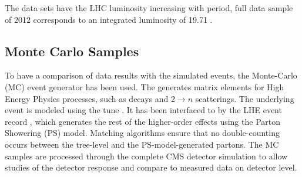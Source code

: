 The data sets have the LHC luminosity increasing with period, full data sample of 2012 corresponds to an integrated luminosity of 19.71 \fbinv. 

\subsection{Monte Carlo Samples}
To have a comparison of data results with the simulated events, the \MadGraphF \cite{Alwall:2011uj} Monte-Carlo (MC) event generator has been used. The \MadGraphF generates matrix elements for High Energy Physics processes, such as decays and $2 \rightarrow n$ scatterings. The underlying event is modeled using the tune \Ztwostar. It has been interfaced to \PYTHIAS \cite{Sjostrand:2006za} by the LHE event record \cite{Alwall:2006yp}, which generates the rest of the higher-order effects using the Parton Showering (PS) model. Matching algorithms ensure that no double-counting occurs between the tree-level and the PS-model-generated partons. The MC samples are processed through the complete CMS detector simulation to allow studies of the detector response and compare to measured data on detector level.

